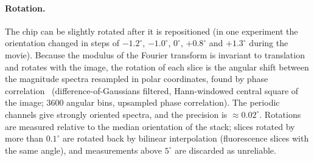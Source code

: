 \documentclass[11pt,a4paper]{article}
\begin{document}
\paragraph{Rotation.} The chip can be slightly rotated after it is repositioned (in one experiment the orientation changed in steps of $-1.2^\circ$, $-1.0^\circ$, $0^\circ$, $+0.8^\circ$ and $+1.3^\circ$ during the movie). Because the modulus of the Fourier transform is invariant to translation and rotates with the image, the rotation of each slice is the angular shift between the magnitude spectra resampled in polar coordinates, found by phase correlation~\cite{reddy1996} (difference-of-Gaussians filtered, Hann-windowed central square of the image; 3600 angular bins, upsampled phase correlation). The periodic channels give strongly oriented spectra, and the precision is $\approx0.02^\circ$. Rotations are measured relative to the median orientation of the stack; slices rotated by more than $0.1^\circ$ are rotated back by bilinear interpolation (fluorescence slices with the same angle), and measurements above $5^\circ$ are discarded as unreliable.
\end{document}
